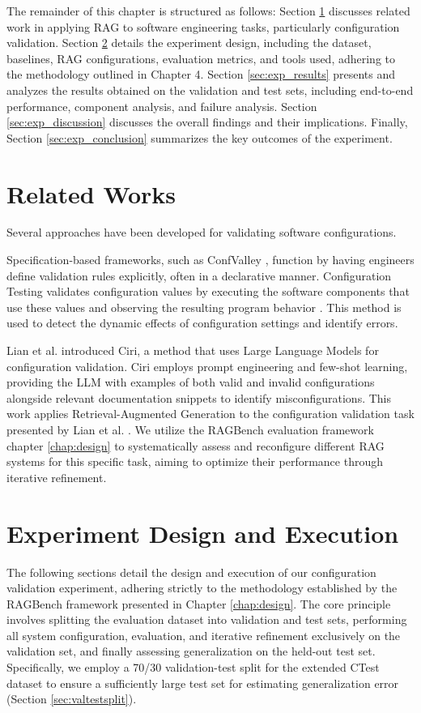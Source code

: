 The remainder of this chapter is structured as follows: Section \ref{sec:related_works_exp} discusses related work in applying RAG to software engineering tasks, particularly configuration validation. Section \ref{sec:exp_design_exec} details the experiment design, including the dataset, baselines, RAG configurations, evaluation metrics, and tools used, adhering to the methodology outlined in Chapter 4. Section \ref{sec:exp_results} presents and analyzes the results obtained on the validation and test sets, including end-to-end performance, component analysis, and failure analysis. Section \ref{sec:exp_discussion} discusses the overall findings and their implications. Finally, Section \ref{sec:exp_conclusion} summarizes the key outcomes of the experiment.

\section{Related Works} \label{sec:related_works_exp}
Several approaches have been developed for validating software configurations.

Specification-based frameworks, such as ConfValley \cite{Huang.2015}, function by having engineers define validation rules explicitly, often in a declarative manner. Configuration Testing validates configuration values by executing the software components that use these values and observing the resulting program behavior \cite{XudongSun.2020}. This method is used to detect the dynamic effects of configuration settings and identify errors.

Lian et al. \cite{Lian.2024} introduced Ciri, a method that uses Large Language Models for configuration validation. Ciri employs prompt engineering and few-shot learning, providing the LLM with examples of both valid and invalid configurations alongside relevant documentation snippets to identify misconfigurations. This work applies Retrieval-Augmented Generation to the configuration validation task presented by Lian et al. \cite{Lian.2024}. We utilize the RAGBench evaluation framework chapter \ref{chap:design} to systematically assess and reconfigure different RAG systems for this specific task, aiming to optimize their performance through iterative refinement.

\section{Experiment Design and Execution} \label{sec:exp_design_exec}
The following sections detail the design and execution of our configuration validation experiment, adhering strictly to the methodology established by the RAGBench framework presented in Chapter \ref{chap:design}. The core principle involves splitting the evaluation dataset into validation and test sets, performing all system configuration, evaluation, and iterative refinement exclusively on the validation set, and finally assessing generalization on the held-out test set. Specifically, we employ a 70/30 validation-test split for the extended CTest dataset to ensure a sufficiently large test set for estimating generalization error (Section \ref{sec:valtestsplit}).

